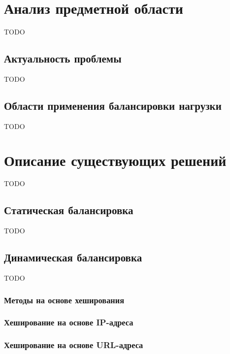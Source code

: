 \section{Анализ предметной области}

TODO

\subsection{Актуальность проблемы}

TODO

\subsection{Области применения балансировки нагрузки}

TODO

\section{Описание существующих решений}

TODO

\subsection{Статическая балансировка}

TODO

\subsection{Динамическая балансировка}

TODO


\subsubsection{Методы на основе хеширования}

\subsubsection*{Хеширование на основе IP-адреса}

\subsubsection*{Хеширование на основе URL-адреса}

